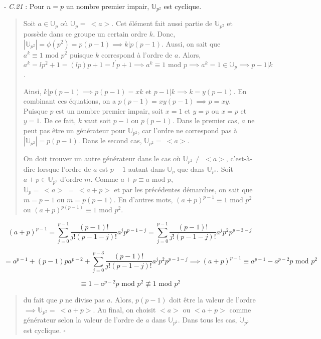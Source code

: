 \textit{- C.21} : Pour $n = p$ un nombre premier impair, $\mathbb{U}_{p^2}$ est cyclique.

\begin{quote}
    Soit $a \in \mathbb{U}_p$ où $\mathbb{U}_p = \ <a>$. Cet élément fait aussi partie de $\mathbb{U}_{p^2}$ et possède dans ce groupe un certain ordre $k$. Donc, $|\mathbb{U}_{p^2}| = \phi(p^2) = p(p-1) \implies k|p(p-1)$. Aussi, on sait que $a^k \equiv 1 \text{ mod } p^2$ puisque $k$ correspond à l'ordre de $a$. Alors, $a^k = lp^2 + 1 = (lp)p + 1 = l^{'}p + 1 \implies a^k \equiv 1 \text{ mod } p \implies a^k = 1 \in \mathbb{U}_p \implies p-1 | k$.

    Ainsi, $k|p(p-1) \implies p(p-1) = xk$ et $p-1|k \implies k = y(p-1)$. En combinant ces équations, on a $p(p-1) = xy(p-1) \implies p = xy$. Puisque $p$ est un nombre premier impair, soit $x=1$ et $y = p$ ou $x=p$ et $y=1$. De ce fait, $k$ vaut soit $p-1$ ou $p(p-1)$. Dans le premier cas, $a$ ne peut pas être un générateur pour $\mathbb{U}_{p^2}$, car l'ordre ne correspond pas à $|\mathbb{U}_{p^2}| = p(p-1)$. Dans le second cas, $\mathbb{U}_{p^2} = \ <a>$.

    On doit trouver un autre générateur dans le cas où $\mathbb{U}_{p^2} \neq \ <a>$, c'est-à-dire lorsque l'ordre de $a$ est $p-1$ autant dans $\mathbb{U}_p$ que dans $\mathbb{U}_{p^2}$. Soit $a+p \in \mathbb{U}_{p^2}$ d'ordre $m$. Comme $a+p \equiv a \text{ mod } p$, $\mathbb{U}_p = \ <a> \ = \ <a+p>$ et par les précédentes démarches, on sait que $m = p-1$ ou $m = p(p-1)$. En d'autres mots, $(a+p)^{p-1} \equiv 1 \text{ mod } p^2$ ou $(a+p)^{p(p-1)} \equiv 1 \text{ mod } p^2$.
\end{quote}

\begin{equation*}
    (a+p)^{p-1} = \sum_{j=0}^{p-1}\frac{(p-1)!}{j!(p-1-j)!} a^j p^{p-1-j} = \sum_{j=0}^{p-1}\frac{(p-1)!}{j!(p-1-j)!} a^j p^2 p^{p-3-j}
\end{equation*}

\begin{equation*}
    = a^{p-1} + (p-1)pa^{p-2} + \sum_{j=0}^{p-3}\frac{(p-1)!}{j!(p-1-j)!} a^j p^2 p^{p-3-j} \implies (a+p)^{p-1} \equiv a^{p-1} - a^{p-2}p \text{ mod } p^2
\end{equation*}

\begin{equation*}
    \equiv 1 - a^{p-2}p \text{ mod } p^2 \not\equiv 1 \text{ mod } p^2
\end{equation*}

\begin{quote}
    du fait que $p$ ne divise pas $a$. Alors, $p(p-1)$ doit être la valeur de l'ordre $\implies \mathbb{U}_{p^2} = \ <a+p>$. Au final, on choisit $<a>$ ou $<a+p>$ comme générateur selon la valeur de l'ordre de $a$ dans $\mathbb{U}_{p^2}$. Dans tous les cas, $\mathbb{U}_{p^2}$ est cyclique. $\square$
\end{quote}

